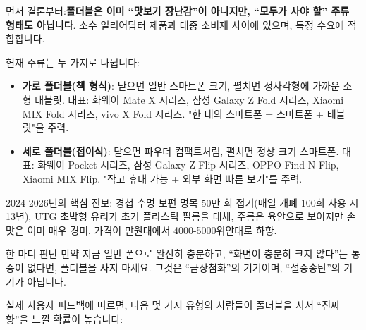 


먼저 결론부터:\textbf{폴더블은 이미 “맛보기 장난감”이 아니지만, “모두가 사야 할” 주류 형태도 아닙니다}. 소수 얼리어답터 제품과 대중 소비재 사이에 있으며, 특정 수요에 적합합니다.

현재 주류는 두 가지로 나뉩니다:

\begin{itemize}
  \item \textbf{가로 폴더블(책 형식)}: 닫으면 일반 스마트폰 크기, 펼치면 정사각형에 가까운 소형 태블릿. 대표: 화웨이 Mate X 시리즈, 삼성 Galaxy Z Fold 시리즈, Xiaomi MIX Fold 시리즈, vivo X Fold 시리즈. "한 대의 스마트폰 = 스마트폰 + 태블릿"을 주력.
  \item \textbf{세로 폴더블(접이식)}: 닫으면 파우더 컴팩트처럼, 펼치면 정상 크기 스마트폰. 대표: 화웨이 Pocket 시리즈, 삼성 Galaxy Z Flip 시리즈, OPPO Find N Flip, Xiaomi MIX Flip. "작고 휴대 가능 + 외부 화면 빠른 보기"를 주력.
\end{itemize}

2024-2026년의 핵심 진보: 경첩 수명 보편 명목 50만 회 접기(매일 개폐 100회 사용 시 13년), UTG 초박형 유리가 초기 플라스틱 필름을 대체, 주름은 육안으로 보이지만 손맛은 이미 매우 경미, 가격이 만원대에서 4000-5000위안대로 하향.

\begin{tcbinfo}{한 마디 판단}
만약 지금 일반 폰으로 완전히 충분하고, “화면이 충분히 크지 않다”는 통증이 없다면, 폴더블을 사지 마세요. 그것은 “금상첨화”의 기기이며, “설중송탄”의 기기가 아닙니다.

\end{tcbinfo}


실제 사용자 피드백에 따르면, 다음 몇 가지 유형의 사람들이 폴더블을 사서 “진짜 향”을 느낄 확률이 높습니다:

